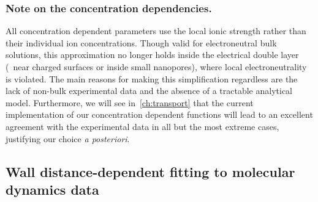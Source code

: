 \subsubsection{Note on the concentration dependencies.}
%

All concentration dependent parameters use the local ionic strength rather than their individual ion
concentrations. Though valid for electroneutral bulk solutions, this approximation no longer holds inside the
electrical double layer (\ie~near charged surfaces or inside small nanopores), where local electroneutrality
is violated. The main reasons for making this simplification regardless are the lack of non-bulk experimental
data and the absence of a tractable analytical model. Furthermore, we will see in~\cref{ch:transport} that the
current implementation of our concentration dependent functions will lead to an excellent agreement with the
experimental data in all but the most extreme cases, justifying our choice \textit{a posteriori}.


%
\subsection[Wall distance-dependent fitting to {MD} data]%
           {Wall distance-dependent fitting to molecular dynamics data}
%

